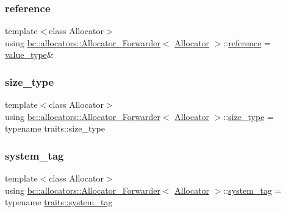 \subsubsection{\texorpdfstring{reference}{reference}}
{\footnotesize\ttfamily template$<$class Allocator$>$ \\
using \hyperlink{structbc_1_1allocators_1_1Allocator__Forwarder}{bc\+::allocators\+::\+Allocator\+\_\+\+Forwarder}$<$ \hyperlink{classbc_1_1allocators_1_1Allocator}{Allocator} $>$\+::\hyperlink{structbc_1_1allocators_1_1Allocator__Forwarder_abe3993f8b29d4a75bb15793f891779fe}{reference} =  \hyperlink{structbc_1_1allocators_1_1Allocator__Forwarder_a3ac0b07579279c948a24ee6562510dc5}{value\+\_\+type}\&}

\mbox{\label{structbc_1_1allocators_1_1Allocator__Forwarder_a254a9a5b0ac8837f64c107db7067e985}} 
\subsubsection{\texorpdfstring{size\+\_\+type}{size\_type}}
{\footnotesize\ttfamily template$<$class Allocator$>$ \\
using \hyperlink{structbc_1_1allocators_1_1Allocator__Forwarder}{bc\+::allocators\+::\+Allocator\+\_\+\+Forwarder}$<$ \hyperlink{classbc_1_1allocators_1_1Allocator}{Allocator} $>$\+::\hyperlink{structbc_1_1allocators_1_1Allocator__Forwarder_a254a9a5b0ac8837f64c107db7067e985}{size\+\_\+type} =  typename traits\+::size\+\_\+type}

\mbox{\label{structbc_1_1allocators_1_1Allocator__Forwarder_a79c1e4e22d9e42518e1195f3583345f5}} 
\subsubsection{\texorpdfstring{system\+\_\+tag}{system\_tag}}
{\footnotesize\ttfamily template$<$class Allocator$>$ \\
using \hyperlink{structbc_1_1allocators_1_1Allocator__Forwarder}{bc\+::allocators\+::\+Allocator\+\_\+\+Forwarder}$<$ \hyperlink{classbc_1_1allocators_1_1Allocator}{Allocator} $>$\+::\hyperlink{structbc_1_1allocators_1_1Allocator__Forwarder_a79c1e4e22d9e42518e1195f3583345f5}{system\+\_\+tag} =  typename \hyperlink{structbc_1_1allocators_1_1allocator__traits_a527cf77071c45a9dcc2c8213f65f37b3}{traits\+::system\+\_\+tag}}

